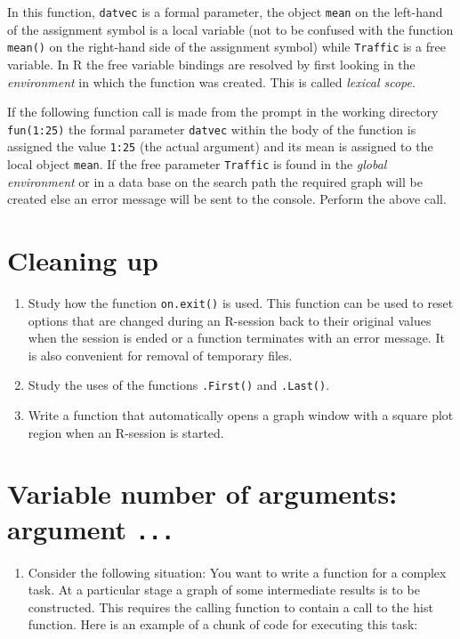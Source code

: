 \documentclass[
]{book}
\providecommand{\tightlist}{%
  \setlength{\itemsep}{0pt}\setlength{\parskip}{0pt}}
\begin{document}
In this function, \texttt{datvec} is a formal parameter, the object \texttt{mean} on the left-hand of the assignment symbol is a local variable (not to be confused with the function \texttt{mean()} on the right-hand side of the assignment symbol) while \texttt{Traffic} is a free variable. In R the free variable bindings are resolved by first looking in the \emph{{environment}} in which the function was created. This is called \emph{{lexical scope}}.

If the following function call is made from the prompt in the working directory \texttt{fun(1:25)} the formal parameter \texttt{datvec} within the body of the function is assigned the value \texttt{1:25} (the actual argument) and its mean is assigned to the local object \texttt{mean}. If the free parameter \texttt{Traffic} is found in the \emph{{global environment}} or in a data base on the search path the required graph will be created else an error message will be sent to the console. Perform the above call.

\section{Cleaning up}\label{cleaning-up}

\begin{enumerate}
\def\labelenumi{(\alph{enumi})}
\item
  Study how the function \texttt{on.exit()} is used. This function can be used to reset options that are changed during an R-session back to their original values when the session is ended or a function terminates with an error message. It is also convenient for removal of temporary files.
\item
  Study the uses of the functions \texttt{.First()} and \texttt{.Last()}.
\item
  Write a function that automatically opens a graph window with a square plot region when an R-session is started.
\end{enumerate}

\section{\texorpdfstring{Variable number of arguments: argument \texttt{...}}{Variable number of arguments: argument ...}}\label{variable-number-of-arguments-argument-...}

\begin{enumerate}
\def\labelenumi{(\alph{enumi})}
\tightlist
\item
  Consider the following situation: You want to write a function for a complex task. At a particular stage a graph of some intermediate results is to be constructed. This requires the calling function to contain a call to the hist function. Here is an example of a chunk of code for executing this task:
\end{enumerate}
\end{document}

